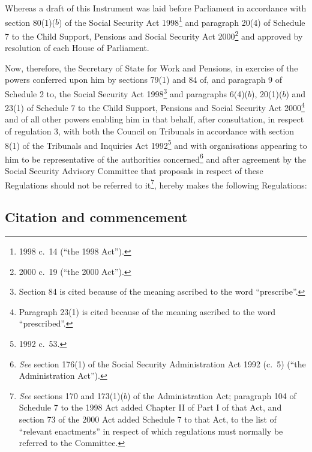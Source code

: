\documentclass[12pt,a4paper]{article}
\title{\regstitle}
\author{S.I.\ 2003 No.\ 1581}
\date{Made
17th June 2003\\
Coming into force
in accordance with regulation 1
}
\begin{document}
\maketitle

\noindent
Whereas a draft of this Instrument was laid before Parliament in accordance with section 80(1)($b$)  of the Social Security Act 1998\footnote{1998 c.\ 14 (“the 1998 Act”).} and paragraph 20(4) of Schedule 7 to the Child Support, Pensions and Social Security Act 2000\footnote{2000 c.\ 19 (“the 2000 Act”).} and approved by resolution of each House of Parliament.

Now, therefore, the Secretary of State for Work and Pensions, in exercise of the powers conferred upon him by sections 79(1) and 84 of, and paragraph 9 of Schedule 2 to, the Social Security Act 1998\footnote{Section 84 is cited because of the meaning ascribed to the word “prescribe”.} and paragraphs 6(4)($b$), 20(1)($b$)  and 23(1) of Schedule 7 to the Child Support, Pensions and Social Security Act 2000\footnote{Paragraph 23(1) is cited because of the meaning ascribed to the word “prescribed”.} and of all other powers enabling him in that behalf, after consultation, in respect of regulation 3, with both the Council on Tribunals in accordance with section 8(1) of the Tribunals and Inquiries Act 1992\footnote{1992 c.\ 53.} and with organisations appearing to him to be representative of the authorities concerned\footnote{\emph{See} section 176(1) of the Social Security Administration Act 1992 (c.\ 5) (“the Administration Act”).} and after agreement by the Social Security Advisory Committee that proposals in respect of these Regulations should not be referred to it\footnote{\emph{See} sections 170 and 173(1)($b$) of the Administration Act; paragraph 104 of Schedule 7 to the 1998 Act added Chapter II of Part I of that Act, and section 73 of the 2000 Act added Schedule 7 to that Act, to the list of “relevant enactments” in respect of which regulations must normally be referred to the Committee.}, hereby makes the following Regulations: 

{\sloppy

\tableofcontents

}

\bigskip

\setcounter{secnumdepth}{-2}

\subsection[1. Citation and commencement]{Citation and commencement}
\end{document}
